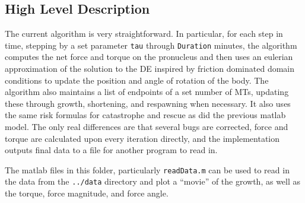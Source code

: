 \documentclass{article}
\begin{document}
\subsection{High Level Description}
The current algorithm is very straightforward. In particular, for each step in
time, stepping by a set parameter \texttt{tau} through \texttt{Duration}
minutes, the algorithm computes the net force and torque on the pronucleus and
then uses an eulerian approximation of the solution to the DE inspired by
friction dominated domain conditions to update the position and angle of
rotation of the body. The algorithm also maintains a list of endpoints of a set
number of MTs, updating these through growth, shortening, and respawning when
necessary. It also uses the same risk formulas for catastrophe and rescue as did
the previous matlab model. The only real differences are that several bugs are
corrected, force and torque are calculated upon every iteration directly, and
the implementation outputs final data to a file for another program to read in. 

The matlab files in this folder, particularly \texttt{readData.m} can be used to
read in the data from the \texttt{../data} directory and plot a ``movie'' of the
growth, as well as the torque, force magnitude, and force angle. 
\end{document}
